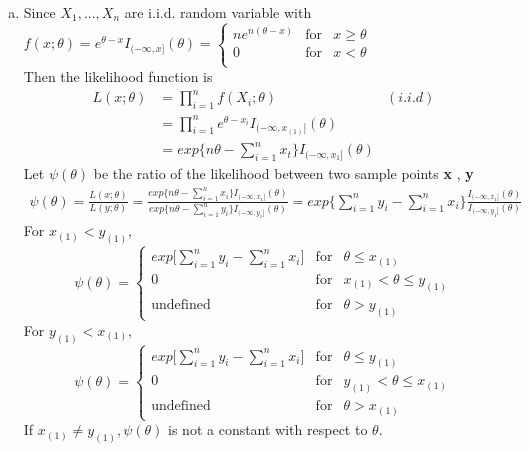 \documentclass[a4paper,11pt]{article}
\begin{document}
\begin{enumerate}[(a)]
\[\begin{array}{rcl}
			ne^{n(\theta-x)} & \mbox{for}
			& x \ge \theta \\ 0 & \mbox{for} & x<\theta \\
			\end{array}\right.
		\]
	\item
		Since $X_1, ... , X_n$ are i.i.d. random variable with $f(x;\theta) = e^{\theta-x}I_{(-\infty,x]}(\theta) =  \left\{ 
			\begin{array}{rcl}
			ne^{n(\theta-x)} & \mbox{for}
			& x \ge \theta \\ 0 & \mbox{for} & x<\theta \\
			\end{array}\right.$
			\\Then the likelihood function is
			\begin{align*}
			L(x;\theta) &= \prod^n_{i=1} f( X_i;\theta) & (i.i.d)\\
			&=  \prod^n_{i=1} e^{\theta-x_i}I_{(-\infty,x_{(1)}]}(\theta) \\
			&= exp\bigg\{ n\theta - \sum^n_{i=1} x_t\bigg\}I_{(-\infty,x_{1}]}(\theta) 
			\end{align*}
		Let $\psi (\theta)$ be the ratio of the likelihood between two sample points {\bf x} , {\bf y}
		\begin{align*}
		\psi(\theta) = \frac{L(x;\theta)}{L(y;\theta)}= \frac{exp\{n\theta-\sum^n_{i=1}x_i\}I_{(-\infty,x_{1}]}(\theta) }{exp\{n\theta-\sum^n_{i=1}y_i\}I_{(-\infty,y_{1}]}(\theta)}=exp \bigg \{ \sum^n_{i=1}y_i-\sum^n_{i=1}x_i \bigg \} \frac{I_{(-\infty,x_{1}]}(\theta) }{I_{(-\infty,y_{1}]}(\theta)}
		\end{align*}
		For $x_{(1)}<y_{(1)}$,
		\[
		\psi (\theta) =
		\left\{ 
			\begin{array}{rcl}
			exp \bigg [ \sum^n_{i=1}y_i-\sum^n_{i=1}x_i \bigg ] & \mbox{for}
			& \theta \le x_{(1)} \\ 0 & \mbox{for} & x_{(1)}<\theta \le y_{(1)} \\
			\mbox{undefined} & \mbox{for}  & \theta> y_{(1)}  
			\end{array}\right.
		\]
		For $y_{(1)}<x_{(1)}$,
		\[
		\psi (\theta) =
		\left\{ 
			\begin{array}{rcl}
			exp \bigg [ \sum^n_{i=1}y_i-\sum^n_{i=1}x_i \bigg ] & \mbox{for}
			& \theta \le y_{(1)} \\ 0 & \mbox{for} & y_{(1)}<\theta \le x_{(1)} \\
			\mbox{undefined} & \mbox{for}  & \theta> x_{(1)}  
			\end{array}\right.
		\]
		If $x_{(1)} \not= y_{(1)}, \psi(\theta)$ is not a constant with respect to $\theta$.

\end{enumerate}
\end{document}

